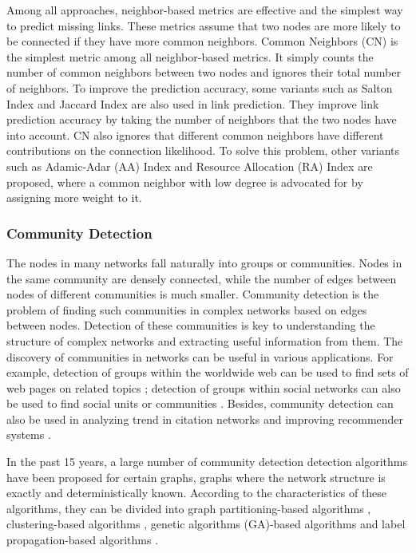 \documentclass[\main/thesis.tex]{subfiles}
\begin{document}
Among all approaches, neighbor-based metrics are effective and the simplest way to predict missing links. These metrics assume that two nodes are more likely to be connected if they have more common neighbors. Common Neighbors (CN) \cite{newman2001clustering} is the simplest metric among all neighbor-based metrics. It simply counts the number of common neighbors between two nodes and ignores their total number of neighbors. To improve the prediction accuracy, some variants such as Salton Index \cite{salton1986introduction} and Jaccard Index \cite{jaccard1901etude} are also used in link prediction. They improve link prediction accuracy by taking the number of neighbors that the two nodes have into account. CN also ignores that different common neighbors have different contributions on the connection likelihood. To solve this problem, other variants such as Adamic-Adar (AA) Index \cite{adamic2003friends} and Resource Allocation (RA) Index \cite{zhou2009predicting} are proposed, where a common neighbor with low degree is advocated for by assigning more weight to it.

\subsubsection{Community Detection}
The nodes in many networks fall naturally into groups or communities. Nodes in the same community are densely connected, while the number of edges between nodes of different communities is much smaller. Community detection is the problem of finding such communities in complex networks based on edges between nodes. Detection of these communities is key to understanding the structure of complex networks and extracting useful information from them. The discovery of communities in networks can be useful in various applications. For example, detection of groups within the worldwide web can be used to find sets of web pages on related topics \cite{flake2002self}; detection of groups within social networks can also be used to find social units or communities \cite{girvan2002community}. Besides, community detection can also be used in analyzing trend in citation networks \cite{bedi2016community} and improving recommender systems \cite{cao2015improved}. 

In the past 15 years, a large number of community detection detection algorithms have been proposed for certain graphs, graphs where the network structure is exactly and deterministically known. According to the characteristics of these algorithms, they can be divided into graph partitioning-based algorithms \cite{kernighan1970efficient,newman2013community}, clustering-based algorithms \cite{girvan2002community,newman2004fast,blondel2008fast,clauset2004finding}, genetic algorithms (GA)-based algorithms \cite{pizzuti2008ga} and label propagation-based algorithms \cite{raghavan2007near}.
\end{document}
